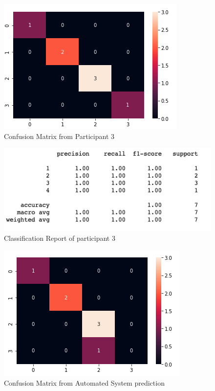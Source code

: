 \begin{figure}[!htp]
    \includegraphics[width=\textwidth]{Images/p3.png}
    \caption{Confusion Matrix from Participant 3}
    \label{fig:f11}
\end{figure}

\begin{figure}[!htp]
    \includegraphics[width=\textwidth]{Images/p3r.png}
    \caption{Classification Report of participant 3}
    \label{fig:f11}
\end{figure}

\pagebreak

\begin{figure}[!htp]
    \includegraphics[width=\textwidth]{Images/a3.png}
    \caption{Confusion Matrix from Automated System prediction}
    \label{fig:f11}
\end{figure}


